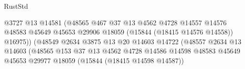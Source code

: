 \begin{lexlean}{RustStd}
\begin{coremodule}
                                                    @3727
                                                    @13
                                                    @14581
                                                    (@48565
                                                      @467
                                                      @37
                                                      @13
                                                      @4562
                                                      @4728
                                                      @14557
                                                      @14576
                                                      @48583
                                                      @45649
                                                      @45653
                                                      @29906
                                                      @18059
                                                      (@15844 (@18415 @14576 @14558))
                                                      @16975))
                                                  (@48549
                                                    @2634
                                                    @3875
                                                    @13
                                                    @20
                                                    @14603
                                                    @14722
                                                    (@48557
                                                      @2634
                                                      @13
                                                      @14603
                                                      (@48565
                                                        @153
                                                        @37
                                                        @13
                                                        @4562
                                                        @4728
                                                        @14586
                                                        @14598
                                                        @48583
                                                        @45649
                                                        @45653
                                                        @29977
                                                        @18059
                                                        (@15844 (@18415 @14598 @14587))

\end{coremodule}
\end{lexlean}
